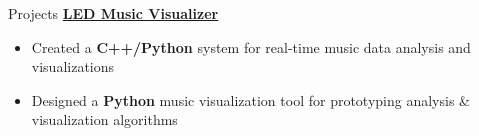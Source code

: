 \documentclass{resume}
\begin{document}
\begin{rSection}{Projects}
    \href{https://www.linkedin.com/feed/update/urn:li:activity:6603722406240628736/}{\bf LED Music Visualizer}
    \vspace{-6pt}
    \begin{itemize}[nosep]
      \item Created a {\bf C++/Python} system for real-time music data analysis and visualizations
      \item Designed a {\bf Python} music visualization tool for prototyping analysis \& visualization algorithms
    \end{itemize}

    

\end{rSection}
\end{document}
